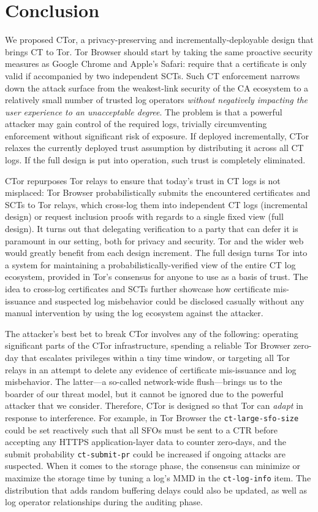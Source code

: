 \section{Conclusion} \label{sec:conclusion} 
We proposed CTor, a privacy-preserving and incrementally-deployable design that
brings CT to Tor.  Tor Browser should start by taking the same proactive
security measures as Google Chrome and Apple's Safari:
	require that a certificate is only valid if accompanied by two
	independent SCTs.
Such CT enforcement narrows down the attack surface from the weakest-link
security of the CA ecosystem to a relatively small number of trusted log
operators \emph{without negatively impacting the user experience to an
unacceptable degree}.  The problem is that a powerful attacker may gain control
of the required logs, trivially circumventing enforcement without significant
risk of exposure.  If deployed incrementally, CTor relaxes the currently
deployed trust assumption by distributing it across all CT logs.  If the full
design is put into operation, such trust is completely eliminated.

CTor repurposes Tor relays to ensure that today's trust in CT logs is not
misplaced:
	Tor Browser probabilistically submits the encountered certificates and SCTs
	to Tor relays, which
		cross-log them into independent CT logs (incremental design)
		or request inclusion proofs with regards to a single fixed view
			(full design).
It turns out that delegating verification to a party that can defer it
is paramount in our setting, both for privacy and security.  Tor and the wider
web would greatly benefit from each design increment.  The full design turns Tor
into a
system for maintaining a probabilistically-verified view of the entire CT log
ecosystem, provided in Tor's consensus for anyone to use as a basis of trust.
The idea to cross-log certificates and SCTs further showcase how certificate
mis-issuance and suspected log misbehavior could be disclosed casually without
any manual intervention by using the log ecosystem against the attacker.

The attacker's best bet to break CTor involves any of the following:
	operating significant parts of the CTor infrastructure,
	spending a reliable Tor Browser zero-day that escalates privileges within a
		tiny time window, or
	targeting all Tor relays in an attempt to delete any evidence of certificate
		mis-issuance and log misbehavior.
The latter---a so-called network-wide flush---brings us to the boarder of our
threat model, but it cannot be ignored due to the powerful attacker that we
consider.  Therefore, CTor is designed so that Tor can \emph{adapt} in response
to interference.  For example, in Tor Browser the \texttt{ct-large-sfo-size}
could be set reactively such that all SFOs must be sent to a CTR before
accepting any HTTPS application-layer data to counter zero-days, and the submit
probability \texttt{ct-submit-pr} could be increased if ongoing attacks are
suspected.  When it comes to the storage phase, the consensus can minimize or
maximize the storage time by tuning a log's MMD in the \texttt{ct-log-info}
item.  The distribution that adds random buffering delays could also be updated,
as well as log operator relationships during the auditing phase.
